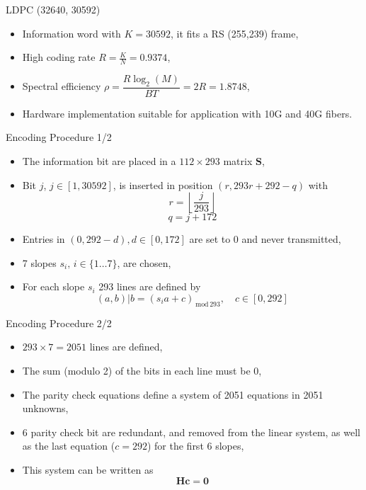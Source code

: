 \documentclass[pdf]
          {beamer}
\newcommand{\lmod}[1] {_{\,\mathrm{mod}\,#1}}
\begin{document}
\begin{frame}{LDPC (32640, 30592)}
	\begin{itemize}
		\item Information word with $K=30592$, it fits a RS (255,239) frame,
		\item High coding rate $R = \frac{K}{N} = 0.9374$,
		\item Spectral efficiency $\rho = \dfrac{R \log_2(M)}{BT} = 2R = 1.8748$,
		\item Hardware implementation suitable for application with 10G and 40G fibers.
	\end{itemize}
	
\end{frame}

\begin{frame}{Encoding Procedure 1/2}
	\begin{itemize}
		\item The information bit are placed in a $112\times 293$ matrix $\mathbf{S}$,
		\item Bit $j$, $j\in[1, 30592]$, is inserted in position $(r, 293r + 292 - q)$ with
		\begin{equation*}
			r = \left\lfloor\dfrac{j}{293}\right\rfloor
		\end{equation*}
		\begin{equation*}
			q = j + 172
		\end{equation*}
		\item Entries in $(0, 292-d), d \in [0, 172]$ are set to 0 and never transmitted,
		\item 7 slopes $s_i, \, i \in \{1 \dots 7\}$, are chosen,
		\item For each slope $s_i$ 293 lines are defined by
		\begin{equation*}
			(a, b) | b = (s_ia + c)\lmod{293}, \quad c \in [0, 292]
		\end{equation*}
	\end{itemize}
\end{frame}

\begin{frame}{Encoding Procedure 2/2}
	\begin{itemize}
		\item $293 \times 7 = 2051$ lines are defined,
		\item The sum (modulo 2) of the bits in each line must be 0,
		\item The parity check equations define a system of 2051 equations in 2051 unknowns,
		\item 6 parity check bit are redundant, and removed from the linear system, as well as the last equation ($c=292$) for the first 6 slopes,
		\item This system can be written as 
		\begin{equation*}
			\mathbf{H} \mathbf{c} = \mathbf{0}
		\end{equation*}
	\end{itemize}
\end{frame}
\end{document}

